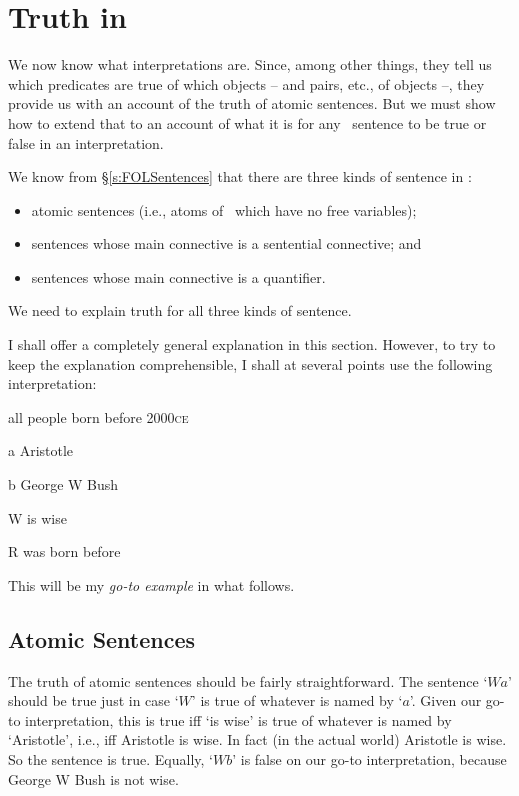 \chapter{Truth in \textnormal{\FOL}}\label{s:TruthFOL}
We now know what interpretations are. Since, among other things, they tell us which predicates are true of which objects – and pairs, etc., of objects –, they provide us with an account of the truth of atomic sentences. But we must show how to extend that to an account of what it is for any \FOL\ sentence to be true or false in an interpretation. 

We know from §\ref{s:FOLSentences} that there are three kinds of sentence in \FOL: 
	\begin{itemize}
		\item atomic sentences (i.e., atoms of \FOL\ which have no free variables);
		\item sentences whose main connective is a sentential connective; and
		\item sentences whose main connective is a quantifier.
	\end{itemize}
We need to explain truth for all three kinds of sentence.

I shall offer a completely general explanation in this section. However, to try to keep the explanation comprehensible, I shall at several points use the following interpretation:
	\begin{ekey}
		\item[\domain] all people born before 2000\textsc{ce}
		\item[a] Aristotle
		\item[b] George W Bush
		\item[W]  is wise
		\item[R]  was born before 
	\end{ekey}
This will be my \emph{go-to example} in what follows. 

\section{Atomic Sentences}\label{fol.truth.atom}
The truth of atomic sentences should be fairly straightforward. The sentence `$Wa$' should be true just in case `$W$' is true of whatever is named by `$a$'. Given our go-to interpretation, this is true iff `is wise' is true of whatever is named by `Aristotle', i.e., iff Aristotle is wise. In fact (in the actual world) Aristotle is wise. So the sentence is true. Equally, `$Wb$' is false on our go-to interpretation, because George W Bush is not wise.

